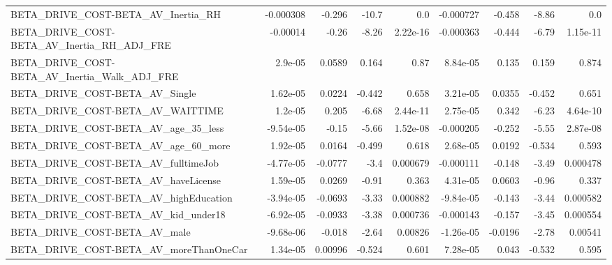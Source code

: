 \begin{tabular}{lrrrrrrrr}
BETA\_DRIVE\_COST-BETA\_AV\_Inertia\_RH                 &   -0.000308 &       -0.296 &    -10.7 &      0.0 &  -0.000727 &      -0.458 &        -8.86 &           0.0 \\
BETA\_DRIVE\_COST-BETA\_AV\_Inertia\_RH\_ADJ\_FRE         &    -0.00014 &        -0.26 &    -8.26 & 2.22e-16 &  -0.000363 &      -0.444 &        -6.79 &      1.15e-11 \\
BETA\_DRIVE\_COST-BETA\_AV\_Inertia\_Walk\_ADJ\_FRE       &     2.9e-05 &       0.0589 &    0.164 &     0.87 &   8.84e-05 &       0.135 &        0.159 &         0.874 \\
BETA\_DRIVE\_COST-BETA\_AV\_Single                     &    1.62e-05 &       0.0224 &   -0.442 &    0.658 &   3.21e-05 &      0.0355 &       -0.452 &         0.651 \\
BETA\_DRIVE\_COST-BETA\_AV\_WAITTIME                   &     1.2e-05 &        0.205 &    -6.68 & 2.44e-11 &   2.75e-05 &       0.342 &        -6.23 &      4.64e-10 \\
BETA\_DRIVE\_COST-BETA\_AV\_age\_35\_less                &   -9.54e-05 &        -0.15 &    -5.66 & 1.52e-08 &  -0.000205 &      -0.252 &        -5.55 &      2.87e-08 \\
BETA\_DRIVE\_COST-BETA\_AV\_age\_60\_more                &    1.92e-05 &       0.0164 &   -0.499 &    0.618 &   2.68e-05 &      0.0192 &       -0.534 &         0.593 \\
BETA\_DRIVE\_COST-BETA\_AV\_fulltimeJob                &   -4.77e-05 &      -0.0777 &     -3.4 & 0.000679 &  -0.000111 &      -0.148 &        -3.49 &      0.000478 \\
BETA\_DRIVE\_COST-BETA\_AV\_haveLicense                &    1.59e-05 &       0.0269 &    -0.91 &    0.363 &   4.31e-05 &      0.0603 &        -0.96 &         0.337 \\
BETA\_DRIVE\_COST-BETA\_AV\_highEducation              &   -3.94e-05 &      -0.0693 &    -3.33 & 0.000882 &  -9.84e-05 &      -0.143 &        -3.44 &      0.000582 \\
BETA\_DRIVE\_COST-BETA\_AV\_kid\_under18                &   -6.92e-05 &      -0.0933 &    -3.38 & 0.000736 &  -0.000143 &      -0.157 &        -3.45 &      0.000554 \\
BETA\_DRIVE\_COST-BETA\_AV\_male                       &   -9.68e-06 &       -0.018 &    -2.64 &  0.00826 &  -1.26e-05 &     -0.0196 &        -2.78 &       0.00541 \\
BETA\_DRIVE\_COST-BETA\_AV\_moreThanOneCar             &    1.34e-05 &      0.00996 &   -0.524 &    0.601 &   7.28e-05 &       0.043 &       -0.532 &         0.595 \\

\end{tabular}
